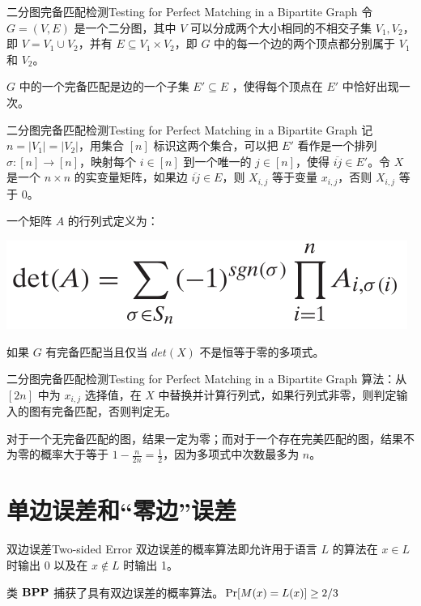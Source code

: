 \documentclass[UTF8,aspectratio=169,mathserif]{beamer}
\begin{document}
	\begin{frame}{二分图完备匹配检测}{Testing for Perfect Matching in a Bipartite Graph}
		令 $G=(V,E)$ 是一个二分图，其中 $V$ 可以分成两个大小相同的不相交子集 $V_1,V_2$，即 $V=V_1\cup V_2$，并有 $E\subseteq V_1\times V_2$，即 $G$ 中的每一个边的两个顶点都分别属于 $V_1$ 和 $V_2$。\newline
		
		$G$ 中的一个完备匹配是边的一个子集 $E'\subseteq E$ ，使得每个顶点在 $E'$ 中恰好出现一次。
	\end{frame}

	\begin{frame}{二分图完备匹配检测}{Testing for Perfect Matching in a Bipartite Graph}
		记 $n=|V_1|=|V_2|$，用集合 $[n]$ 标识这两个集合，可以把 $E'$ 看作是一个排列 $\sigma:[n]\rightarrow[n]$，映射每个 $i\in[n]$ 到一个唯一的 $j\in[n]$，使得 $\overline{ij}\in E'$。令 $X$ 是一个 $n\times n$ 的实变量矩阵，如果边 $\overline{ij}\in E$，则 $X_{i,j}$ 等于变量 $x_{i,j}$，否则 $X_{i,j}$ 等于 0。\newline
		
		一个矩阵 $A$ 的行列式定义为：
		
		\includegraphics[width=0.4\linewidth]{../../7/note.assets/image-20210509123241893.png}\newline
		
		如果 $G$ 有完备匹配当且仅当 $det(X)$ 不是恒等于零的多项式。
	\end{frame}

	\begin{frame}{二分图完备匹配检测}{Testing for Perfect Matching in a Bipartite Graph}
		算法：从 $[2n]$ 中为 $x_{i,j}$ 选择值，在 $X$ 中替换并计算行列式，如果行列式非零，则判定输入的图有完备匹配，否则判定无。\newline
		
		对于一个无完备匹配的图，结果一定为零；而对于一个存在完美匹配的图，结果不为零的概率大于等于 $1-\frac{n}{2n}=\frac{1}{2}$，因为多项式中次数最多为 $n$。
	\end{frame}
	
	\section{单边误差和“零边”误差}
	\begin{frame}{双边误差}{Two-sided Error}
		双边误差的概率算法即允许用于语言 $L$ 的算法在 $x\in L$ 时输出 0 以及在 $x\notin L$ 时输出 1。\newline
		
		类 $\bf BPP$ 捕获了具有双边误差的概率算法。${\rm Pr}[M(x)=L(x)]\ge 2/3$
	\end{frame}
\end{document}
